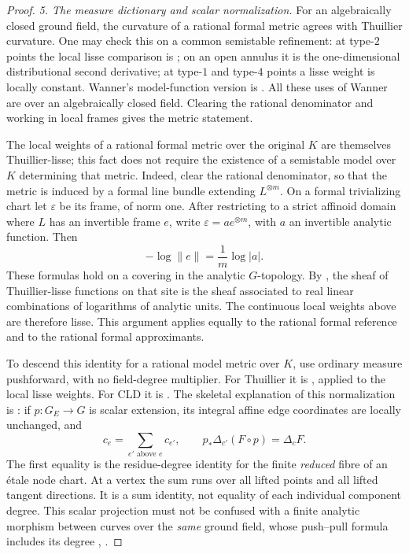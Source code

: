 \begin{proof}
\emph{5. The measure dictionary and scalar normalization.}
For an algebraically closed ground field, the curvature of a rational
formal metric agrees with Thuillier curvature.  One may check this
on a common semistable refinement: at type-\(2\) points the local
lisse comparison is \cite[Proposition~4.2]{Wanner19}; on an open
annulus it is the one-dimensional distributional second derivative;
at type-\(1\) and type-\(4\) points a lisse weight is locally
constant.  Wanner's model-function version is
\cite[Theorem~3.28]{Wanner19}.  All these uses of Wanner are over
an algebraically closed field.  Clearing the rational denominator
and working in local frames gives the metric statement.

The local weights of a rational formal metric over the original
\(K\) are themselves Thuillier-lisse; this fact does not require the
existence of a semistable model over \(K\) determining that metric.
Indeed, clear the rational denominator, so that the metric is induced
by a formal line bundle extending \(L^{\otimes m}\).  On a formal
trivializing chart let \(\varepsilon\) be its frame, of norm one.
After restricting to a strict affinoid domain where \(L\) has an invertible
frame \(e\), write \(\varepsilon=a e^{\otimes m}\), with \(a\) an
invertible analytic function.  Then
\[
                   -\log\lVert e\rVert=\frac1m\log|a|.
\]
These formulas hold on a covering in the analytic \(G\)-topology.
By \cite[Proposition~3.2.5]{Thu05}, the sheaf of Thuillier-lisse
functions on that site is the sheaf associated to real linear
combinations of logarithms of analytic units.  The continuous local
weights above are therefore lisse.  This argument applies equally
to the rational formal reference and to the rational formal
approximants.

To descend this identity for a rational model metric over \(K\),
use ordinary measure pushforward, with no field-degree multiplier.
For Thuillier it is \cite[Theorem~3.2.10(i)]{Thu05}, applied to
the local lisse weights.  For CLD it is
\cite[Corollary~18.3.3(a)]{CLD25}.  The skeletal explanation of this
normalization is \cite[Proposition~2.2.21]{Thu05}: if \(p:G_E\to G\)
is scalar extension, its integral affine edge coordinates are locally
unchanged, and
\begin{equation}
\label{eq:ch29-curve-scalar-weights}
 c_e=\sum_{e'\text{ above }e}c_{e'},
 \qquad
 p_*\Delta_{c'}(F\circ p)=\Delta_cF.
\end{equation}
The first equality is the residue-degree identity for the finite
\emph{reduced} fibre of an \'etale node chart.  At a vertex the sum
runs over all lifted points and all lifted tangent directions.
It is a sum identity, not equality of each individual component degree.
This scalar projection must not be confused with a finite analytic
morphism between curves over the \emph{same} ground field, whose
push--pull formula includes its degree
\cite[\S3.2.3]{Thu05}, \cite[Corollary~18.3.3(b)]{CLD25}.


\end{proof}
